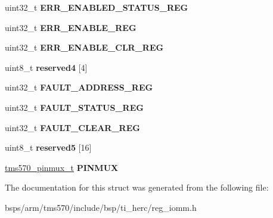\begin{DoxyCompactItemize}
uint32\+\_\+t {\bfseries E\+R\+R\+\_\+\+E\+N\+A\+B\+L\+E\+D\+\_\+\+S\+T\+A\+T\+U\+S\+\_\+\+R\+EG}
\item 
\mbox{\label{structtms570__iomm__t_a5e298e492b8182dfea5ea123c7569536}} 
uint32\+\_\+t {\bfseries E\+R\+R\+\_\+\+E\+N\+A\+B\+L\+E\+\_\+\+R\+EG}
\item 
\mbox{\label{structtms570__iomm__t_a746367a5144ac83851490c7054459ffd}} 
uint32\+\_\+t {\bfseries E\+R\+R\+\_\+\+E\+N\+A\+B\+L\+E\+\_\+\+C\+L\+R\+\_\+\+R\+EG}
\item 
\mbox{\label{structtms570__iomm__t_a740994f06cd3dde46282498515f1560d}} 
uint8\+\_\+t {\bfseries reserved4} \mbox{[}4\mbox{]}
\item 
\mbox{\label{structtms570__iomm__t_adea628698fef8614ecd697657ee0c410}} 
uint32\+\_\+t {\bfseries F\+A\+U\+L\+T\+\_\+\+A\+D\+D\+R\+E\+S\+S\+\_\+\+R\+EG}
\item 
\mbox{\label{structtms570__iomm__t_acd99fcd2f6e0d138463bba35f7e35e2a}} 
uint32\+\_\+t {\bfseries F\+A\+U\+L\+T\+\_\+\+S\+T\+A\+T\+U\+S\+\_\+\+R\+EG}
\item 
\mbox{\label{structtms570__iomm__t_af83a515c746ca5dbf335626be5a01b04}} 
uint32\+\_\+t {\bfseries F\+A\+U\+L\+T\+\_\+\+C\+L\+E\+A\+R\+\_\+\+R\+EG}
\item 
\mbox{\label{structtms570__iomm__t_ac530dd41a58faad636430682977fe9fd}} 
uint8\+\_\+t {\bfseries reserved5} \mbox{[}16\mbox{]}
\item 
\mbox{\label{structtms570__iomm__t_ac961b0eb5e56f7f3360aba3dc2ca350f}} 
\mbox{\hyperlink{structtms570__pinmux__t}{tms570\+\_\+pinmux\+\_\+t}} {\bfseries P\+I\+N\+M\+UX}
\end{DoxyCompactItemize}


The documentation for this struct was generated from the following file\+:\begin{DoxyCompactItemize}
\item 
bsps/arm/tms570/include/bsp/ti\+\_\+herc/reg\+\_\+iomm.\+h\end{DoxyCompactItemize}
